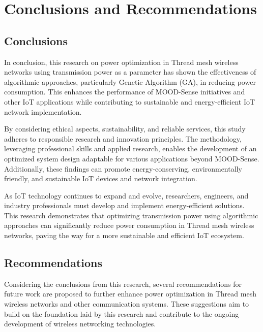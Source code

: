 \chapter{Conclusions and Recommendations}\label{cap:conclusions_recommendations}

\section{Conclusions}\label{sec:conclusions}
In conclusion, this research on power optimization in Thread mesh wireless networks using transmission power as a parameter has shown the effectiveness of algorithmic approaches, particularly Genetic Algorithm (GA), in reducing power consumption. This enhances the performance of MOOD-Sense initiatives and other IoT applications while contributing to sustainable and energy-efficient IoT network implementation.

By considering ethical aspects, sustainability, and reliable services, this study adheres to responsible research and innovation principles. The methodology, leveraging professional skills and applied research, enables the development of an optimized system design adaptable for various applications beyond MOOD-Sense. Additionally, these findings can promote energy-conserving, environmentally friendly, and sustainable IoT devices and network integration.

As IoT technology continues to expand and evolve, researchers, engineers, and industry professionals must develop and implement energy-efficient solutions. This research demonstrates that optimizing transmission power using algorithmic approaches can significantly reduce power consumption in Thread mesh wireless networks, paving the way for a more sustainable and efficient IoT ecosystem.


\section{Recommendations}\label{sec:recommendations}
Considering the conclusions from this research, several recommendations for future work are proposed to further enhance power optimization in Thread mesh wireless networks and other communication systems. These suggestions aim to build on the foundation laid by this research and contribute to the ongoing development of wireless networking technologies.

